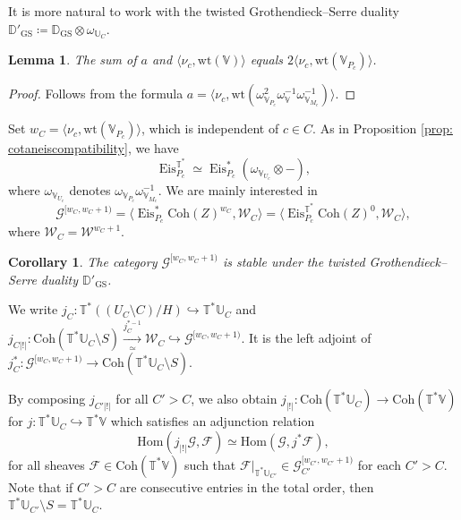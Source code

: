 \documentclass{amsart}
\newtheorem{lemma}[theorem]{Lemma}
\newtheorem{corollary}[theorem]{Corollary}
\theoremstyle{definition}
\theoremstyle{remark}
\numberwithin{equation}{section}
\newcommand{\U}{\mathbb{U}}
\newcommand{\mc}{\mathcal}
\newcommand{\Hom}{\mathrm{Hom}}
\newcommand{\D}{\mathbb{D}}
\DeclareMathOperator{\Eis}{\mathrm{Eis}}
\newcommand{\Coh}{\mathrm{Coh}}
\newcommand{\GS}{\mathrm{GS}}
\newcommand{\V}{\mathbb{V}}
\newcommand{\T}{\mathbb{T}}
\newcommand{\ush}{\lvert ! \rvert}
\newcommand{\wt}{\mathrm{wt}}
\begin{document}
It is more natural to work with the twisted Grothendieck--Serre duality $\D'_{\GS}\coloneq\D_\GS\otimes \omega_{\U_C}$.

\begin{lemma}
The sum of $a$ and $\langle \nu_c, \wt(\V) \rangle$ equals $2\langle \nu_c, \wt(\V_{P_c})\rangle$.  
\end{lemma}
\begin{proof}
Follows from the formula $a = \langle \nu_c, \wt(\omega^2_{\V_{P_c}}\omega^{-1}_{\V}\omega^{-1}_{\V_{M_c}})\rangle$.
\end{proof}

Set $w_C=\langle \nu_c, \wt(\V_{P_c})\rangle$, which is independent of $c\in C$. As in Proposition \ref{prop: cotaneiscompatibility}, we have
\begin{equation*}
    \Eis^{\T^{\ast}}_{P_c}\simeq\Eis^*_{P_c} (\omega_{\V_{U_c}}\otimes-),
\end{equation*}
where $\omega_{\V_{U_c}}$ denotes $\omega_{\V_{P_c}} \omega^{-1}_{\V_{M_c}}$.
We are mainly interested in
\[
\mathcal{G}^{[w_C,w_C+1)}=\langle \Eis^*_{P_c} \Coh(Z)^{w_C}, \mathcal{W}_C\rangle=\langle \Eis^{\T^{\ast}}_{P_c} \Coh(Z)^{0}, \mathcal{W}_C\rangle,
\]
where $\mathcal{W}_C=\mathcal{W}^{w_C+1}$. 

\begin{corollary}{\label{cor: Gstableundertwistedduality}}
The category $\mathcal{G}^{[w_C, w_C+1)}$ is stable under the twisted Grothendieck--Serre duality $\D'_\GS$. 
\end{corollary}

We write $j_C \colon \T^*  (( U_C\setminus C)/H) \hookrightarrow \T^* \U_C$ and $j_{C \ush} \colon \Coh(\T^* \U_C\setminus S) \xrightarrow[\simeq]{j_C^{*-1}} \mathcal{W}_C\hookrightarrow \mathcal{G}^{[w_C, w_C + 1)}$. It is the left adjoint of $j^*_C \colon \mathcal{G}^{[w_C, w_C + 1)}\to \Coh(\T^* \U_C\setminus S)$.

By composing $j_{C'\ush}$ for all $C'> C$, we also obtain  $j_{\ush} \colon \Coh(\T^{\ast}\U_C)\to \Coh (\T^{\ast}\V)$ for $j\colon \T^* \U_C\hookrightarrow \T^{\ast}\V$ which satisfies an adjunction relation 
\begin{equation*}
    \Hom(j_{\ush} \mc{G} , \mc{F}) \simeq \Hom(\mc{G}, j^{\ast} \mc{F}),
\end{equation*}
for all sheaves $\mc{F} \in \Coh(\T^{\ast} \V)$ such that $\mc{F}|_{\T^* \U_{C'}} \in \mc{G}^{[w_{C'}, w_{C'}+1)}_{C'}$ for each $C' > C$. Note that if $C'>C$ are consecutive entries in the total order, then $\T^{\ast}\U_{C'} \setminus S = \T^{\ast}\U_C$. 
\end{document}
